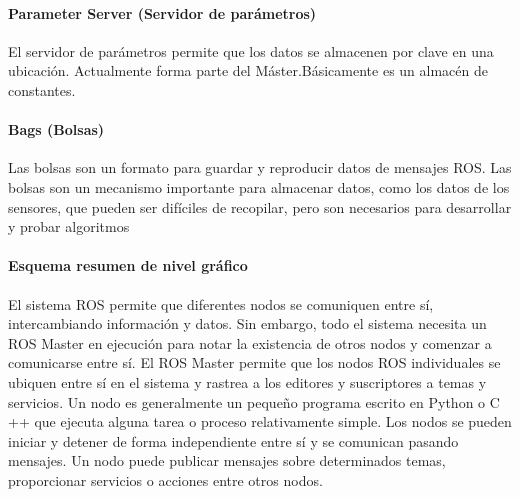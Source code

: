             \paragraph{ Parameter Server (Servidor de parámetros)}
                 El servidor de parámetros permite que los datos se almacenen por clave en una ubicación. Actualmente forma parte del Máster.Básicamente es un almacén de constantes.

               
            \paragraph{Bags (Bolsas)}
            Las bolsas son un formato para guardar y reproducir datos de mensajes ROS. Las bolsas son un mecanismo importante para almacenar datos, como los datos de los sensores, que pueden ser difíciles de recopilar, pero son necesarios para desarrollar y probar algoritmos
               \newpage
               
            \paragraph{Esquema resumen de nivel gráfico}
                El sistema ROS permite que diferentes nodos se comuniquen entre sí, intercambiando información y datos. Sin embargo, todo el sistema necesita un ROS Master en ejecución para notar la existencia de otros nodos y comenzar a comunicarse entre sí. El ROS Master permite que los nodos ROS individuales se ubiquen entre sí en el sistema y rastrea a los editores y suscriptores a temas y servicios. Un nodo es generalmente un pequeño programa escrito en Python o C ++ que ejecuta alguna tarea o proceso relativamente simple. Los nodos se pueden iniciar y detener de forma independiente entre sí y se comunican pasando mensajes. Un nodo puede publicar mensajes sobre determinados temas, proporcionar servicios o acciones entre otros nodos. 
                
                
                
